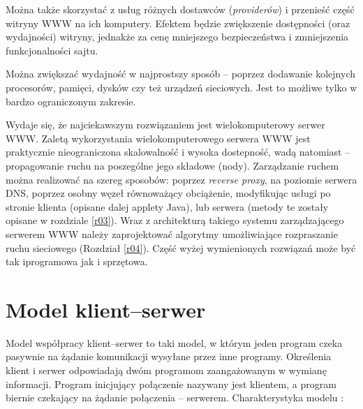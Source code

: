 Można także skorzystać z usług różnych dostawców (\emph{providerów})
i przenieść część witryny WWW na ich komputery. Efektem będzie zwiększenie dostępności 
(oraz wydajności) witryny, jednakże za cenę mniejszego bezpieczeństwa i zmniejszenia 
funkcjonalności sajtu.

Można zwiększać wydajność w najprostszy sposób --
poprzez dodawanie kolejnych procesorów, pamięci, dysków czy też urządzeń sieciowych. Jest to 
możliwe tylko w bardzo ograniczonym zakresie. 

Wydaje się, że najciekawszym rozwiązaniem
jest wielokomputerowy serwer WWW. Zaletą wykorzystania wielokomputerowego serwera WWW
jest praktycznie nieograniczona skalowalność i wysoka dostepność, wadą natomiast -- 
propagowanie ruchu na poszególne jego składowe (nody). Zarządzanie ruchem można realizować na
szereg sposobów: poprzez \emph{reverse proxy}, na poziomie serwera DNS, poprzez osobny węzeł
równoważący obciążenie, modyfikując usługi po stronie klienta (opisane dalej applety Java), lub
serwera (metody te zostały opisane w rozdziale \ref{r03}). Wraz z architekturą takiego systemu zarządzającego serwerem WWW
należy zaprojektować algorytmy umożliwiające rozpraszanie ruchu sieciowego (Rozdział \ref{r04}).
Część wyżej wymienionych rozwiązań może być tak iprogramowa jak i sprzętowa.

\section{Model klient--serwer}

\hspace{0.63cm}Model współpracy klient--serwer to taki model, w którym jeden program czeka pasywnie na żądanie komunikacji
wysyłane przez inne programy. Określenia klient i serwer odpowiadają dwóm programom zaangażowanym w wymianę informacji.
Program inicjujący połączenie nazywany jest klientem, a program biernie czekający na żądanie połączenia -- serwerem. Charakterystyka modelu \cite{siecikomputerowe}:

